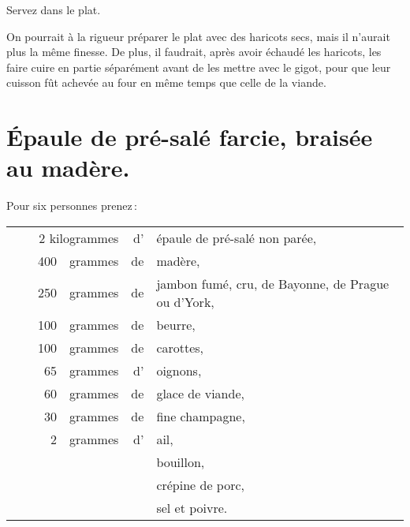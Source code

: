 Servez dans le plat.

\sk

On pourrait à la rigueur préparer le plat avec des haricots secs, mais il
n'aurait plus la même finesse. De plus, il faudrait, après avoir échaudé les
haricots, les faire cuire en partie séparément avant de les mettre avec le
gigot, pour que leur cuisson fût achevée au four en même temps que celle de la
viande.

\section*{\centering Épaule de pré-salé farcie, braisée au madère.}
{}

Pour six personnes prenez :

\medskip

\footnotesize
\begin{longtable}{rp{2em}rrrp{16em}}
& \multicolumn{3}{r}{2 kilogrammes} & d' & épaule de pré-salé non parée,                                  \\
& & 400 & grammes & de & madère,                                                                          \\
& & 250 & grammes & de & jambon fumé, cru, de Bayonne, de Prague ou d'York,                               \\
& & 100 & grammes & de & beurre,                                                                          \\
& & 100 & grammes & de & carottes,                                                                        \\
& &  65 & grammes & d' & oignons,                                                                         \\
& &  60 & grammes & de & glace de viande,                                                                 \\
& &  30 & grammes & de & fine champagne,                                                                  \\
& &   2 & grammes & d' & ail,                                                                             \\
& &     &         &    & bouillon,                                                                        \\
& &     &         &    & crépine de porc,                                                                 \\
& &     &         &    & sel et poivre.                                                                   \\
\end{longtable}
\normalsize

